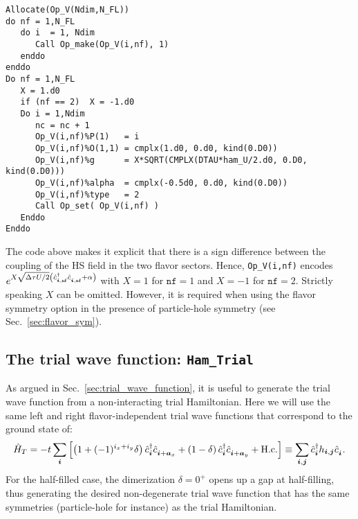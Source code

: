 \begin{lstlisting}[style=fortran]
Allocate(Op_V(Ndim,N_FL))
do nf = 1,N_FL
   do i  = 1, Ndim
      Call Op_make(Op_V(i,nf), 1)
   enddo
enddo
Do nf = 1,N_FL
   X = 1.d0
   if (nf == 2)  X = -1.d0
   Do i = 1,Ndim
      nc = nc + 1
      Op_V(i,nf)%P(1)   = i
      Op_V(i,nf)%O(1,1) = cmplx(1.d0, 0.d0, kind(0.D0))
      Op_V(i,nf)%g      = X*SQRT(CMPLX(DTAU*ham_U/2.d0, 0.D0, kind(0.D0))) 
      Op_V(i,nf)%alpha  = cmplx(-0.5d0, 0.d0, kind(0.D0))
      Op_V(i,nf)%type   = 2
      Call Op_set( Op_V(i,nf) )
   Enddo
Enddo
\end{lstlisting}
The code above makes it explicit that there is a sign difference between the coupling of the HS field in the two flavor sectors.        Hence,  
\texttt{Op\_V(i,nf)}     encodes    $ e^{  X \sqrt{\Delta   \tau U/2} \left( \hat{c}^{\dagger}_{\ve{i},{\texttt{nf}}}  \hat{c}^{\phantom\dagger}_{\ve{i},{\texttt{nf}}}  + \alpha  \right) }  $    with  $X=1 $  for  $\texttt{nf}=1$  and $X=-1 $  for  $\texttt{nf}=2$.    Strictly  speaking  $X$  can  be  omitted.  However,  it  is  required  when  using the  flavor  symmetry  option in the presence  of  particle-hole  symmetry (see  Sec.~\ref{sec:flavor_sym}). 


\subsection{The trial wave function: \texttt{Ham\_Trial}} \label{U_PV_Ham_Trial}
\label{Sec:Plain_vanilla_trial}
As  argued in Sec.~\ref{sec:trial_wave_function}, it is useful to generate the trial wave function from a non-interacting trial Hamiltonian.   Here we will  use the same left and right  flavor-independent trial wave functions that correspond to the ground state of: 
\begin{equation}
   \hat{H}_T    = - t \sum_{\ve{i}} \left[  \left( 1 + (-1)^{i_x + i_y}  \delta \right)  \hat{c}^{\dagger}_{\ve{i}}   \hat{c}^{\phantom\dagger}_{\ve{i} +\ve{a}_x}  +  
   							\left(1 - \delta \right)  \hat{c}^{\dagger}_{\ve{i}}   \hat{c}^{\phantom\dagger}_{\ve{i} +\ve{a}_y}    + \hc  \right]   \equiv   \sum_{\ve{i},\ve{j}}  \hat{c}^{\dagger}_{\ve{i}}   h_{\ve{i},\ve{j}}  \hat{c}^{\phantom\dagger}_{\ve{i}}.
\end{equation}
For the half-filled case, the  dimerization $\delta  = 0^{+} $  opens up a gap at  half-filling,   thus generating the desired  non-degenerate  trial wave function  that has the same symmetries (particle-hole  for instance) as  the   trial  Hamiltonian.

